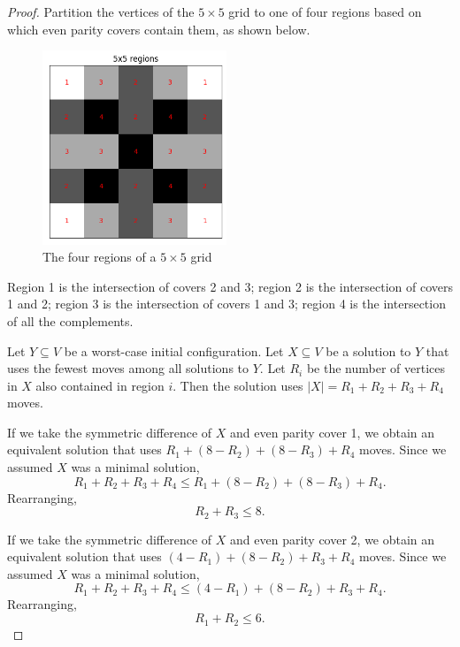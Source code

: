 \documentclass[a4paper]{article}
\newcommand{\abs}[1]{\left| #1 \right|}
\begin{document}
\begin{proof}
		Partition the vertices of the $5 \times 5$ grid to one of four regions based on which even parity covers contain them, as shown below.
		
		\begin{figure}[H]
			\centering
			\includegraphics[width=0.49\textwidth]{../../code/serialization/regions/5x5_regions.png}
			\caption{The four regions of a $5 \times 5$ grid}
		\end{figure}
	
		Region 1 is the intersection of covers 2 and 3;
		region 2 is the intersection of  covers 1 and 2;
		region 3 is the intersection of covers 1 and 3;
		region 4 is the intersection of all the complements.
		
		Let $Y \subseteq V$ be a worst-case initial configuration.
		Let $X \subseteq V$ be a solution to $Y$ that uses the fewest moves among all solutions to $Y$.
		Let $R_i$ be the number of vertices in $X$ also contained in region $i$.
		Then the solution uses $\abs{X} = R_1 + R_2 + R_3 + R_4$ moves.
		
		If we take the symmetric difference of $X$ and even parity cover 1, we obtain an equivalent solution that uses $R_1 + (8 - R_2) + (8 - R_3) + R_4$ moves.
		Since we assumed $X$ was a minimal solution,
		\begin{equation*}
			R_1 + R_2 + R_3 + R_4 \leq R_1 + (8 - R_2) + (8 - R_3) + R_4.
		\end{equation*}
		Rearranging,
		\begin{equation}\label{5x5_constr1}
			R_2 + R_3 \leq 8.
		\end{equation}
	
		If we take the symmetric difference of $X$ and even parity cover 2, we obtain an equivalent solution that uses $(4 - R_1) + (8 - R_2) + R_3 + R_4$ moves.
		Since we assumed $X$ was a minimal solution,
		\begin{equation*}
			R_1 + R_2 + R_3 + R_4 \leq (4 - R_1) + (8 - R_2) + R_3 + R_4.
		\end{equation*}
		Rearranging,
		\begin{equation}\label{5x5_constr2}
			R_1 + R_2 \leq 6.
		\end{equation}
	

\end{proof}
\end{document}
